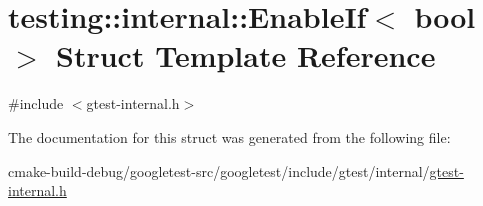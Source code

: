 \hypertarget{structtesting_1_1internal_1_1EnableIf}{}\section{testing\+::internal\+::Enable\+If$<$ bool $>$ Struct Template Reference}
\label{structtesting_1_1internal_1_1EnableIf}


{\ttfamily \#include $<$gtest-\/internal.\+h$>$}



The documentation for this struct was generated from the following file\+:\begin{DoxyCompactItemize}
\item 
cmake-\/build-\/debug/googletest-\/src/googletest/include/gtest/internal/\mbox{\hyperlink{gtest-internal_8h}{gtest-\/internal.\+h}}\end{DoxyCompactItemize}

